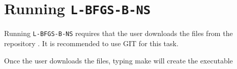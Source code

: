 
\chapter{Running \texttt{L-BFGS-B-NS}} %

\label{AppendixA} %


Running \texttt{L-BFGS-B-NS} requires that the user downloads the files from the repository \citep{lbfgsbNS}. It is recommended to use GIT for this task.

Once the user downloads the files, typing make will create the executable 


